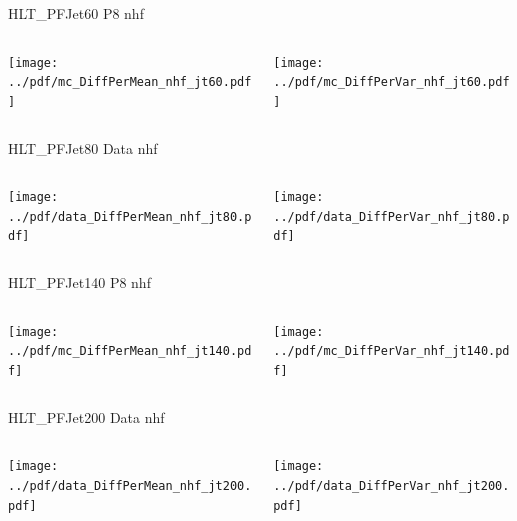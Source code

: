 \documentclass[9pt]{beamer}
\begin{document}
\begin{frame}[t]{HLT\_PFJet60 P8 nhf}
\begin{columns}[T]
  \begin{column}{.5\textwidth}
  \texttt{[image: ../pdf/mc\_DiffPerMean\_nhf\_jt60.pdf]}
  \end{column}
  \begin{column}{.5\textwidth}
  \texttt{[image: ../pdf/mc\_DiffPerVar\_nhf\_jt60.pdf]}
  \end{column}
\end{columns}
\end{frame}

\begin{frame}[t]{HLT\_PFJet80 Data nhf}
\begin{columns}[T]
  \begin{column}{.5\textwidth}
  \texttt{[image: ../pdf/data\_DiffPerMean\_nhf\_jt80.pdf]}
  \end{column}
  \begin{column}{.5\textwidth}
  \texttt{[image: ../pdf/data\_DiffPerVar\_nhf\_jt80.pdf]}
  \end{column}
\end{columns}
\end{frame}

\begin{frame}[t]{HLT\_PFJet140 P8 nhf}
\begin{columns}[T]
  \begin{column}{.5\textwidth}
  \texttt{[image: ../pdf/mc\_DiffPerMean\_nhf\_jt140.pdf]}
  \end{column}
  \begin{column}{.5\textwidth}
  \texttt{[image: ../pdf/mc\_DiffPerVar\_nhf\_jt140.pdf]}
  \end{column}
\end{columns}
\end{frame}

\begin{frame}[t]{HLT\_PFJet200 Data nhf}
\begin{columns}[T]
  \begin{column}{.5\textwidth}
  \texttt{[image: ../pdf/data\_DiffPerMean\_nhf\_jt200.pdf]}
  \end{column}
  \begin{column}{.5\textwidth}
  \texttt{[image: ../pdf/data\_DiffPerVar\_nhf\_jt200.pdf]}
  \end{column}
\end{columns}
\end{frame}
\end{document}
